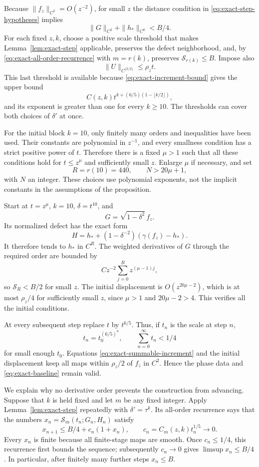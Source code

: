 Because $\|f_z\|_{C^2}=O(z^{-2})$, for small $z$ the distance condition
in \eqref{eq:exact-step-hypotheses} implies
\begin{equation}\label{eq:exact-baseline}
 \|G\|_{C^2}+\|h_*\|_{C^0}<B/4.
\end{equation}
For each fixed $z,k$, choose a positive scale threshold that makes
Lemma~\ref{lem:exact-step} applicable, preserves the defect neighborhood,
and, by \eqref{eq:exact-all-order-recurrence} with $m=r(k)$, preserves
$\mathcal S_{r(k)}\le B$.  Impose also
\begin{equation}\label{eq:exact-summable-increment}
 \|U\|_{C^{\lfloor k/2\rfloor}}\le\rho_z t.
\end{equation}
This last threshold is available because
\eqref{eq:exact-increment-bound} gives the upper bound
\[
 C(z,k)t^{k+(6/5)(1-\lfloor k/2\rfloor)},
\]
and its exponent is greater than one for every $k\ge10$.
The thresholds can cover both choices of $\delta'$ at once.

For the initial block $k=10$, only finitely many orders and
inequalities have been used.  Their constants are polynomial in
$z^{-1}$, and every smallness condition has a strict positive power
of $t$.  Therefore there is a fixed $\mu>1$ such that all these
conditions hold for $t\le z^\mu$ and sufficiently small $z$.
Enlarge $\mu$ if necessary, and set
\[
 R=r(10)=440,\qquad N>20\mu+1,
\]
with $N$ an integer.  These choices use polynomial exponents, not the
implicit constants in the assumptions of the proposition.

Start at $t=z^\mu$, $k=10$, $\delta=t^{10}$, and
\[
 G=\sqrt{1-\delta^2}\,f_z.
\]
Its normalized defect has the exact form
\[
 H=h_*+(1-\delta^{-2})(\gamma(f_z)-h_*).
\]
It therefore tends to $h_*$ in $C^R$.  The weighted derivatives of
$G$ through the required order are bounded by
\[
 C z^{-2}\sum_{j=0}^R z^{(\mu-1)j},
\]
so $\mathcal S_R<B/2$ for small $z$.  The initial displacement is
$O(z^{20\mu-2})$, which is at most $\rho_z/4$ for sufficiently small
$z$, since $\mu>1$ and $20\mu-2>4$.  This verifies all the initial conditions.

At every subsequent step replace $t$ by $t^{6/5}$.  Thus, if $t_n$
is the scale at step $n$,
\[
 t_n=t_0^{(6/5)^n},\qquad \sum_{n=0}^\infty t_n<1/4
\]
for small enough $t_0$.  Equations
\eqref{eq:exact-summable-increment} and the initial displacement keep
all maps within $\rho_z/2$ of $f_z$ in $C^2$.  Hence the phase data
and \eqref{eq:exact-baseline} remain valid.

We explain why no derivative order prevents the construction from
advancing.  Suppose that $k$ is held fixed and let $m$ be any fixed
integer.  Apply Lemma~\ref{lem:exact-step} repeatedly with
$\delta'=\tau^k$.  Its all-order recurrence says that the numbers
$x_n=\mathcal S_m(t_n;G_n,H_n)$ satisfy
\[
 x_{n+1}\le B/4+c_n(1+x_n),\qquad
 c_n=C_m(z,k)t_n^{1/5}\longrightarrow0.
\]
Every $x_n$ is finite because all finite-stage maps are smooth.  Once
$c_n\le1/4$, this recurrence first bounds the sequence; subsequently
$c_n\to0$ gives $\limsup x_n\le B/4$.  In particular, after finitely
many further steps $x_n\le B$.

